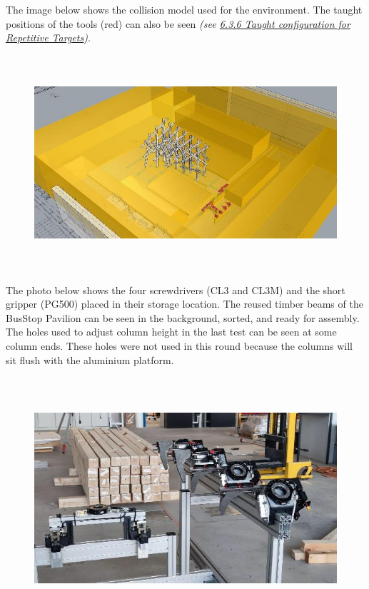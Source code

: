 \documentclass[11pt]{book}
\begin{document}
The image below shows the collision model used for the environment. The taught positions of the tools (red) can also be seen \textit{\textcolor[HTML]{B7B7B7}{(see \uline{6.3.6 Taught configuration for Repetitive Targets})}}.

\begin{figure}[H]
\includegraphics[width=15.92cm,height=7.97cm]{./images/image68.jpeg}
\end{figure}


The photo below shows the four screwdrivers (CL3 and CL3M) and the short gripper (PG500) placed in their storage location. The reused timber beams of the BusStop Pavilion can be seen in the background, sorted, and ready for assembly. The holes used to adjust column height in the last test can be seen at some column ends. These holes were not used in this round because the columns will sit flush with the aluminium platform.

\begin{figure}[H]
\includegraphics[width=15.92cm,height=8.96cm]{./images/image69.jpeg}
\end{figure}
\end{document}
